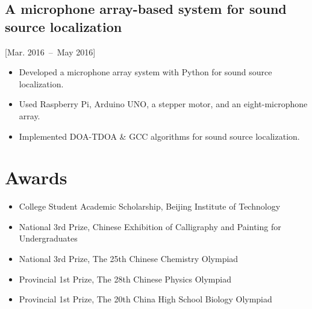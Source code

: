 \documentclass{mycv}
\begin{document}
\subsection{A microphone array-based system for sound source localization}[Mar. 2016~--~May 2016]

\begin{itemize}
  \itemsep 0em
  \item Developed a microphone array system with Python for sound source localization.
  \item Used Raspberry Pi, Arduino UNO, a stepper motor, and an eight-microphone array.
  \item Implemented DOA-TDOA \& GCC algorithms for sound source localization.
\end{itemize}



\vspace{-0.5em}

\section{Awards}

\begin{itemize}
  \itemsep 0em
  \item College Student Academic Scholarship, Beijing Institute of Technology 
  \item National 3rd Prize, Chinese Exhibition of Calligraphy and Painting for Undergraduates 
  \item National 3rd Prize, The 25th Chinese Chemistry Olympiad 
  \item Provincial 1st Prize, The 28th Chinese Physics Olympiad 
  \item Provincial 1st Prize, The 20th China High School Biology Olympiad 
\end{itemize}
\end{document}
